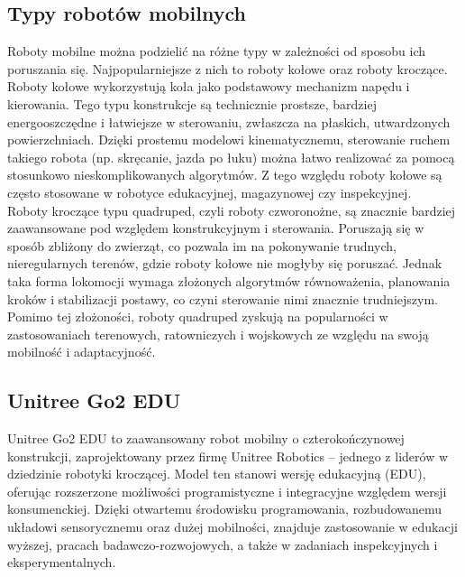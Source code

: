 \documentclass[12pt]{article}
\begin{document}
\subsection{Typy robotów mobilnych}

\noindent Roboty mobilne można podzielić na różne typy w zależności od sposobu ich poruszania się. Najpopularniejsze z nich to roboty kołowe oraz roboty kroczące.\\

\noindent Roboty kołowe wykorzystują koła jako podstawowy mechanizm napędu i kierowania. Tego typu konstrukcje są technicznie prostsze, bardziej energooszczędne i łatwiejsze w sterowaniu, zwłaszcza na płaskich, utwardzonych powierzchniach. Dzięki prostemu modelowi kinematycznemu, sterowanie ruchem takiego robota (np. skręcanie, jazda po łuku) można łatwo realizować za pomocą stosunkowo nieskomplikowanych algorytmów. Z tego względu roboty kołowe są często stosowane w robotyce edukacyjnej, magazynowej czy inspekcyjnej.\\

\noindent Roboty kroczące typu quadruped, czyli roboty czworonożne, są znacznie bardziej zaawansowane pod względem konstrukcyjnym i sterowania. Poruszają się w sposób zbliżony do zwierząt, co pozwala im na pokonywanie trudnych, nieregularnych terenów, gdzie roboty kołowe nie mogłyby się poruszać. Jednak taka forma lokomocji wymaga złożonych algorytmów równoważenia, planowania kroków i stabilizacji postawy, co czyni sterowanie nimi znacznie trudniejszym. Pomimo tej złożoności, roboty quadruped zyskują na popularności w~ zastosowaniach terenowych, ratowniczych i wojskowych ze względu na swoją mobilność i adaptacyjność.

\subsection{Unitree Go2 EDU}

\noindent Unitree Go2 EDU to zaawansowany robot mobilny o czterokończynowej konstrukcji, zaprojektowany przez firmę Unitree Robotics – jednego z liderów w dziedzinie robotyki kroczącej. Model ten stanowi wersję edukacyjną (EDU), oferując rozszerzone możliwości programistyczne i integracyjne względem wersji konsumenckiej. Dzięki otwartemu środowisku programowania, rozbudowanemu układowi sensorycznemu oraz dużej mobilności, znajduje zastosowanie w edukacji wyższej, pracach badawczo-rozwojowych, a także w zadaniach inspekcyjnych i eksperymentalnych.\\
\end{document}
